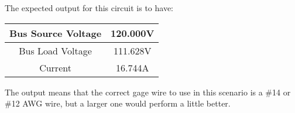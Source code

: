 \documentclass{article}
\begin{document}
	\vspace{10pt}
	
	The expected output for this circuit is to have:
	
	\vspace{10pt}
	
	\begin{tabular}{c | c }
		Bus Source Voltage & 120.000V \\
		\hline
		Bus Load Voltage & 111.628V \\
		\hline
		Current & 16.744A
	\end{tabular}
	
	\vspace{10pt}
	
	The output means that the correct gage wire to use in this scenario is a \#14 or \#12 AWG wire, but a larger one would perform a little better.
	
\end{document}
